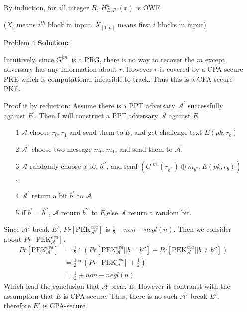 \normalfont\documentclass[letterpaper,11pt]{article}
\begin{document}
\begin{enumerate}
	By induction, for all integer $B$, $H^h_{B,IV}(x)$ is OWF.\par
	($X_i$ means $i^{th}$ block in input. $X_{[1:n]}$ means first $i$ blocks in input)
\item [Problem 4]\textbf{Solution:}\par
	Intuitively, since $G^{|m|}$ is a PRG, there is no way to recover the $m$ except adversary has any information about $r$. However $r$ is covered by a CPA-secure PKE which is computational infeasible to track. Thus this is a CPA-secure PKE.\par
	Proof it by reduction:
		Assume there is a PPT adversary $\mathcal{A}^\prime$ successfully against $E^\prime$. Then I will construct a PPT adversary $\mathcal{A}$ against $E$.
		\begin{enumerate}
			\item[1] $\mathcal{A}$ choose $r_0,r_1$ and send them to $E$, and get challenge text $E(pk,r_b)$
			\item[2] $\mathcal{A}^\prime$ choose two message $m_0,m_1$, and send them to $\mathcal{A}$.
			\item[3] $\mathcal{A}$ randomly choose a bit $b^{\prime\prime}$, and send $(G^{|m|}(r_{b^{\prime\prime}})\oplus m_{b^{\prime\prime}}, E(pk,r_b))$.
			\item[4] $\mathcal{A}^\prime$ return a bit $b^\prime$ to $\mathcal{A}$
			\item[5] if $b^\prime = b^{\prime\prime}$, $\mathcal{A}$ return $b^{\prime\prime}$ to $E$,else $\mathcal{A}$ return a random bit.
		\end{enumerate}
		Since $\mathcal{A}'$ break $E'$, $Pr[\text{PEK}^{eva}_{\mathcal{A}'}]$ is $\frac{1}{2}+non-negl(n)$. Then we consider about $Pr[\text{PEK}^{eva}_{\mathcal{A}}]$.
		\begin{align*}
		Pr[\text{PEK}^{eva}_{\mathcal{A}}] &= \frac{1}{2} * (Pr[\text{PEK}^{eva}_{\mathcal{A}}||b = b''] + Pr[\text{PEK}^{eva}_{\mathcal{A}}||b \neq b''])\\
		&= \frac{1}{2} * (Pr[\text{PEK}^{eva}_{\mathcal{A}'}] + \frac{1}{2})\\
		&= \frac{1}{2} + non-negl(n)
		\end{align*}
		Which lead the conclusion that $\mathcal{A}$ break $E$. However it contranst with the assumption that $E$ is CPA-secure. Thus, there is no such $\mathcal{A}'$ break $E'$, therefore $E'$ is CPA-secure.


\end{enumerate}
\end{document}
